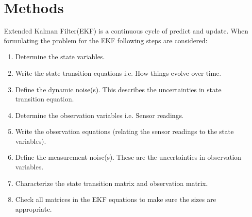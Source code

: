 \documentclass[12pt]{article}
\begin{document}
\section{Methods}
Extended Kalman Filter(EKF) is a continuous cycle of predict and update. When formulating the problem for the EKF following steps are considered:
\begin{enumerate}
	\item Determine the state variables.
	\item Write the state transition equations i.e. How things evolve over time.
	\item Define the dynamic noise(s).  This describes the uncertainties in state transition equation.
	\item Determine the observation variables i.e. Sensor readings.
	\item Write the observation equations (relating the sensor readings to the state variables).
	\item Define the measurement noise(s). These are the uncertainties in observation variables.
	\item Characterize the state transition matrix and observation matrix.
	\item Check all matrices in the EKF equations to make sure the sizes are appropriate.
\end{enumerate}
\end{document}
